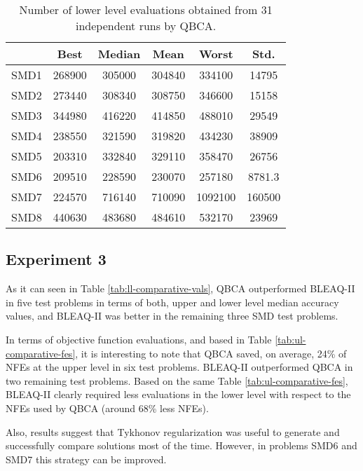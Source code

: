 \documentclass[conference]{IEEEtran}
\theoremstyle{definition}
\begin{document}
\begin{table}[!ht]
    \caption{Number of lower level evaluations obtained from 31 independent runs by QBCA.}
    \label{tab:ll-evals}
    \centering
    \begin{tabular}{cccccc}
        \hline
        & Best &  Median &  Mean &  Worst &  Std. \\ \hline
        SMD1 & 268900 & 305000 & 304840 & 334100 & 14795 \\ \hline 
        SMD2 & 273440 & 308340 & 308750 & 346600 & 15158 \\ \hline 
        SMD3 & 344980 & 416220 & 414850 & 488010 & 29549 \\ \hline 
        SMD4 & 238550 & 321590 & 319820 & 434230 & 38909 \\ \hline 
        SMD5 & 203310 & 332840 & 329110 & 358470 & 26756 \\ \hline 
        SMD6 & 209510 & 228590 & 230070 & 257180 & 8781.3 \\ \hline 
        SMD7 & 224570 & 716140 & 710090 & 1092100 & 160500 \\ \hline 
        SMD8 & 440630 & 483680 & 484610 & 532170 & 23969 \\ \hline 
    \end{tabular}
\end{table}


\subsection{Experiment 3}
As it can seen in Table \ref{tab:ll-comparative-vals}, QBCA outperformed BLEAQ-II
in five test problems in terms of both, upper and lower level median accuracy
values, and BLEAQ-II was better in the remaining three SMD test problems. 

In terms of objective function evaluations, and based in Table \ref{tab:ul-comparative-fes},
it is interesting to note that QBCA saved, on average, 24\% of NFEs at the upper
level in six test problems. BLEAQ-II outperformed QBCA in two remaining test
problems. Based on the same Table \ref{tab:ul-comparative-fes}, BLEAQ-II clearly
required less evaluations in the lower level with respect to the NFEs used by
QBCA (around 68\% less NFEs). 

Also, results suggest that Tykhonov regularization was useful to generate and
successfully compare solutions most of the time. However, in problems SMD6 and
SMD7 this strategy can be improved.
\end{document}
